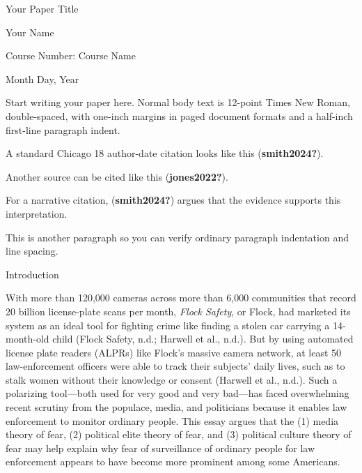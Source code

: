 \documentclass[
  american,
  12pt,
  letterpaper,
]{article}
\author{}
\date{}
\begin{document}
\begin{titlepage}

\thispagestyle{empty}


\vspace*{0.30\textheight}

{\centering

Your Paper Title\par

%

\vspace{8\baselineskip}

Your Name\par
Course Number: Course Name\par
Month Day, Year\par

}

\end{titlepage}


\setcounter{page}{1}

Start writing your paper here. Normal body text is 12-point Times New
Roman, double-spaced, with one-inch margins in paged document formats
and a half-inch first-line paragraph indent.

A standard Chicago 18 author-date citation looks like this
(\textbf{smith2024?}).

Another source can be cited like this (\textbf{jones2022?}).

For a narrative citation, (\textbf{smith2024?}) argues that the evidence
supports this interpretation.

This is another paragraph so you can verify ordinary paragraph
indentation and line spacing.

Introduction

With more than 120,000 cameras across more than 6,000 communities that
record 20 billion license-plate scans per month, \emph{Flock Safety}, or
Flock, had marketed its system as an ideal tool for fighting crime like
finding a stolen car carrying a 14-month-old child (Flock Safety, n.d.;
Harwell et al., n.d.). But by using automated license plate readers
(ALPRs) like Flock's massive camera network, at least 50 law-enforcement
officers were able to track their subjects' daily lives, such as to
stalk women without their knowledge or consent (Harwell et al., n.d.).
Such a polarizing tool---both used for very good and very bad---has
faced overwhelming recent scrutiny from the populace, media, and
politicians because it enables law enforcement to monitor ordinary
people. This essay argues that the (1) media theory of fear, (2)
political elite theory of fear, and (3) political culture theory of fear
may help explain why fear of surveillance of ordinary people for law
enforcement appears to have become more prominent among some Americans.
\end{document}
